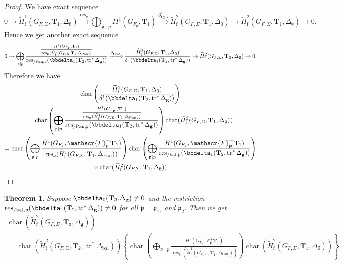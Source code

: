 \documentclass[10pt]{amsart}
\numberwithin{equation}{section}
\newtheorem{thm}{Theorem}[section]
\theoremstyle{definition}
\theoremstyle{remark} %
\DeclareMathOperator{\Char}{char}
\newcommand{\pan}{\mathrm{Pan}}
\DeclareMathOperator{\res}{res}
\DeclareMathOperator{\tr}{{tr}^*}
\renewcommand{\b}{\mathrm{bal}}
\newcommand{\f}{\mathbf{f}}
\newcommand{\scrF}{\mathscr{F}}
\newcommand{\g}{\mathbf{g}}
\newcommand{\p}{\mathfrak{p}}
\newcommand{\T}{\mathbf{T}}
\begin{document}
		\begin{proof}
			We have exact sequence
			\begin{equation}
				0 \rightarrow \widetilde{H}^1_{\mathrm{f}}(G_{F,\Sigma}, \T_1, \Delta_{\emptyset}) \xrightarrow{\res_p} \bigoplus_{\p \mid p} H^1(G_{F_\p},\T_{1}) \xrightarrow{\partial_{\f \otimes \lambda}^1} \widetilde{H}^2_{\mathrm{f}}(G_{F,\Sigma}, \T_1, \Delta_{0}) \rightarrow \widetilde{H}^2_{\mathrm{f}}(G_{F,\Sigma}, \T_1, \Delta_{\emptyset}) \rightarrow 0.
			\end{equation}
			Hence we get another exact sequence
			\begin{equation}
				0 \rightarrow \bigoplus_{\p \mid p} \dfrac{\frac{H^1(G_{F_\p},\T_{1})}{\res_{\p}(\widetilde{H}^1_{\mathrm{f}}(G_{F,\Sigma},\T_{1}, \Delta_{\pan})) }}{\res_{/\pan, \p}(\bbdelta_1(\T_2, \operatorname{tr}^*\Delta_{\g}))} \xrightarrow{\partial_{\f \otimes \lambda}^1} \dfrac{\widetilde{H}^2_{\mathrm{f}}(G_{F,\Sigma}, \T_1, \Delta_{0})}{\delta^1(\bbdelta_1(\T_{2}, \tr\Delta_{\g}))}\rightarrow \widetilde{H}^2_{\mathrm{f}}(G_{F,\Sigma}, \T_1, \Delta_{\emptyset}) \rightarrow 0.
			\end{equation}
			Therefore we have 
			\begin{multline}
				\Char\left( \dfrac{\widetilde{H}^2_{\mathrm{f}}(G_{F,\Sigma}, \T_1, \Delta_{0})}{\delta^1(\bbdelta_1(\T_{2}, \tr\Delta_{\g}))} \right) \\
				= \Char \left( \bigoplus_{\p \mid p} \dfrac{\frac{H^1(G_{F_\p},\T_{1})}{\res_{\p}(\widetilde{H}^1_{\mathrm{f}}(G_{F,\Sigma},\T_{1}, \Delta_{\pan})) }}{\res_{/\pan, \p}(\bbdelta_1(\T_2, \operatorname{tr}^*\Delta_{\g}))} \right) \Char(\widetilde{H}^2_{\mathrm{f}}(G_{F,\Sigma}, \T_1, \Delta_{\emptyset})) \\
				= \Char\left( \bigoplus_{\p \mid p}\frac{H^1(G_{F_\p},\scrF^+_\p \T_{1})}{\res_{\p}(\widetilde{H}^1_{\mathrm{f}}(G_{F,\Sigma},\T_{1}, \Delta_{\pan})) }\right) \Char\left( \bigoplus_{\p \mid p} \frac{H^1(G_{F_\p},\scrF^-_\p \T_{1})}{ \res_{/\b, \p}(\bbdelta_1(\T_2, \operatorname{tr}^*\Delta_{\g}))} \right) \\
				\times \Char(\widetilde{H}^2_{\mathrm{f}}(G_{F,\Sigma}, \T_1, \Delta_{\emptyset}))
			\end{multline}	
		\end{proof}
		\begin{thm}
			\label{main_theorem_2}
			Suppose $  \bbdelta_0(\T_{3}.\Delta_\g) \ne 0 $ and the restriction $ \res_{/\b, \p}(\bbdelta_1(\T_2, \operatorname{tr}^*\Delta_{\g})) \ne 0 $ for all $ \p = \p_1 $, and $ \p_2 $. Then we get
			\begin{multline*}
				\Char \left( \widetilde{H}^2_{\mathrm{f}}(G_{F,\Sigma}, \T_3, \Delta_{\g})  \right) \\
				= \Char(\widetilde{H}^2_{\mathrm{f}}(G_{F,\Sigma}, \T_2, \operatorname{tr}^*\Delta_{\mathrm{bal}}))
				\left\lbrace \Char\left( \bigoplus_{\p \mid p}\frac{H^1(G_{F_\p},\scrF^+_\p \T_{1})}{\res_{\p}(\widetilde{H}^1_{\mathrm{f}}(G_{F,\Sigma},\T_{1}, \Delta_{\pan})) }\right) \Char(\widetilde{H}^2_{\mathrm{f}}(G_{F,\Sigma}, \T_1, \Delta_{\emptyset})) \right\rbrace .
			\end{multline*}
		\end{thm}
\end{document}
